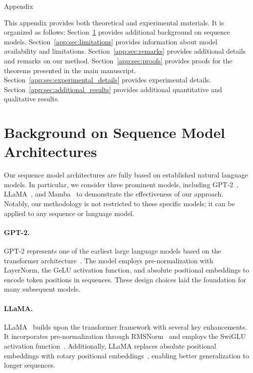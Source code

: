 \vspace*{0.3cm}
\begin{center}
    {\huge Appendix}
\end{center}
\vspace*{0.5cm}
This appendix provides both theoretical and experimental materials. It is organized as follows: Section~\ref{app:sec:background} provides additional background on sequence models. Section~\ref{app:sec:limitations} provides information about model availability and limitations. Section~\ref{app:sec:remarks} provides additional details and remarks on our method. Section~\ref{app:sec:proofs} provides proofs for the theorems presented in the main manuscript. Section~\ref{app:sec:experimental_details} provides experimental details. Section~\ref{app:sec:additional_results} provides additional quantitative and qualitative results.

\section{Background on Sequence Model Architectures}\label{app:sec:background}
Our sequence model architectures are fully based on established natural language models. In particular, we consider three prominent models, including GPT-2~\citep{radford2019gpt2}, LLaMA~\citep{touvron2023llama,touvron2023llama2}, and Mamba~\citep{gu2023mamba} to demonstrate the effectiveness of our approach. Notably, our methodology is not restricted to these specific models; it can be applied to any sequence or language model.

\paragraph{GPT-2.}
GPT-2 represents one of the earliest large language models based on the transformer architecture~\citep{vaswani2017attention}. The model employs pre-normalization with LayerNorm, the GeLU activation function, and absolute positional embeddings to encode token positions in sequences. These design choices laid the foundation for many subsequent models.

\paragraph{LLaMA.}
LLaMA~\citep{touvron2023llama,touvron2023llama2} builds upon the transformer framework with several key enhancements. It incorporates pre-normalization through RMSNorm~\citep{zhang2019rmsnorm} and employs the SwiGLU activation function~\citep{shazeer2020glu}. Additionally, LLaMA replaces absolute positional embeddings with rotary positional embeddings~\citep{su2024rope}, enabling better generalization to longer sequences.

